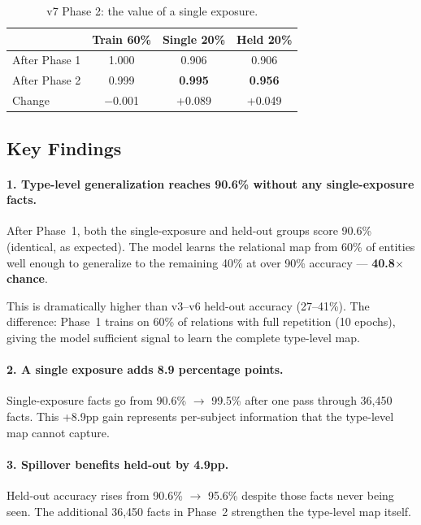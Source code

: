 \documentclass[11pt]{article}
\begin{document}
\begin{table}[h]
\centering
\caption{v7 Phase 2: the value of a single exposure.}
\label{tab:v7p2}
\begin{tabular}{lccc}
\toprule
& Train 60\% & Single 20\% & Held 20\% \\
\midrule
After Phase 1 & 1.000 & 0.906 & 0.906 \\
After Phase 2 & 0.999 & \textbf{0.995} & \textbf{0.956} \\
Change & $-$0.001 & +0.089 & +0.049 \\
\bottomrule
\end{tabular}
\end{table}

\subsection{Key Findings}

\paragraph{1. Type-level generalization reaches 90.6\% without any single-exposure facts.}
After Phase~1, both the single-exposure and held-out groups score 90.6\% (identical,
as expected).  The model learns the relational map from 60\% of entities well enough
to generalize to the remaining 40\% at over 90\% accuracy ---
\textbf{40.8$\times$ chance}.

This is dramatically higher than v3--v6 held-out accuracy (27--41\%).  The difference:
Phase~1 trains on 60\% of relations with full repetition (10 epochs), giving the model
sufficient signal to learn the complete type-level map.

\paragraph{2. A single exposure adds 8.9 percentage points.}
Single-exposure facts go from 90.6\% $\to$ 99.5\% after one pass through 36,450 facts.
This +8.9pp gain represents per-subject information that the type-level map cannot
capture.

\paragraph{3. Spillover benefits held-out by 4.9pp.}
Held-out accuracy rises from 90.6\% $\to$ 95.6\% despite those facts never being seen.
The additional 36,450 facts in Phase~2 strengthen the type-level map itself.
\end{document}
